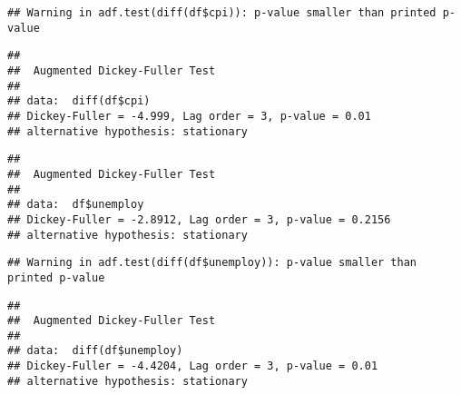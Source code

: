 \documentclass[
]{article}
\newenvironment{Shaded}{\begin{snugshade}}{\end{snugshade}}
\newcommand{\CommentTok}[1]{\textcolor[rgb]{0.56,0.35,0.01}{\textit{#1}}}
\newcommand{\FunctionTok}[1]{\textcolor[rgb]{0.13,0.29,0.53}{\textbf{#1}}}
\newcommand{\NormalTok}[1]{#1}
\newcommand{\SpecialCharTok}[1]{\textcolor[rgb]{0.81,0.36,0.00}{\textbf{#1}}}
\begin{document}
\begin{Shaded}
\end{Shaded}

\begin{verbatim}
## Warning in adf.test(diff(df$cpi)): p-value smaller than printed p-value
\end{verbatim}

\begin{verbatim}
## 
##  Augmented Dickey-Fuller Test
## 
## data:  diff(df$cpi)
## Dickey-Fuller = -4.999, Lag order = 3, p-value = 0.01
## alternative hypothesis: stationary
\end{verbatim}

\begin{Shaded}
\end{Shaded}

\begin{verbatim}
## 
##  Augmented Dickey-Fuller Test
## 
## data:  df$unemploy
## Dickey-Fuller = -2.8912, Lag order = 3, p-value = 0.2156
## alternative hypothesis: stationary
\end{verbatim}

\begin{Shaded}
\end{Shaded}

\begin{verbatim}
## Warning in adf.test(diff(df$unemploy)): p-value smaller than printed p-value
\end{verbatim}

\begin{verbatim}
## 
##  Augmented Dickey-Fuller Test
## 
## data:  diff(df$unemploy)
## Dickey-Fuller = -4.4204, Lag order = 3, p-value = 0.01
## alternative hypothesis: stationary
\end{verbatim}
\end{document}
